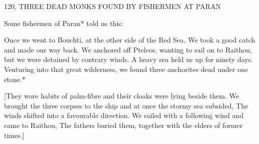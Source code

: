120, THREE DEAD MONKS FOUND BY FISHERMEN
AT PARAN

Some fishermen of Paran* told us this:

Once we went to Bouchti, at the other side of the Red Sea. We took
a good catch and made our way back. We anchored off Pteleos,
wanting to sail on to Raithou, but we were detained by contrary
winds. A heavy sea held us up for ninety days. Venturing into that
great wilderness, we found three anchorites dead under one stone.*

[They wore habits of palm-fibre and their cloaks were lying beside
them. We brought the three corpses to the ship and at once the
stormy sea subsided, The winds shifted into a favourable direction.
We sailed with a following wind and came to Raithou, The fathers
buried them, together with the elders of former times.]
